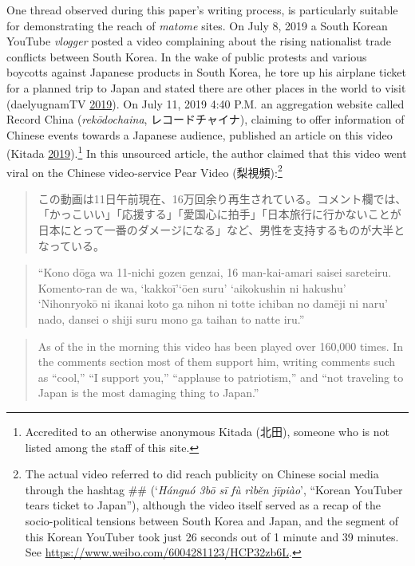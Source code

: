 \documentclass[10pt,british,A4paper,oneside]{memoir}
\begin{document}
One thread observed during this paper's writing process, is particularly
suitable for demonstrating the reach of \emph{matome} sites. On July 8,
2019 a South Korean YouTube \emph{vlogger} posted a video complaining
about the rising nationalist trade conflicts between South Korea. In the
wake of public protests and various boycotts against Japanese products
in South Korea, he tore up his airplane ticket for a planned trip to
Japan and stated there are other places in the world to visit
(daelyugnamTV \protect\hyperlink{ref-daelyugnamtv_eng._2019}{2019}). On
July 11, 2019 4:40 P.M. an aggregation website called Record China
(\emph{rekōdochaina}, レコードチャイナ), claiming to offer information
of Chinese events towards a Japanese audience, published an article on
this video (Kitada
\protect\hyperlink{ref-kitada_eng._2019}{2019}).\footnote{Accredited to
  an otherwise anonymous Kitada (北田), someone who is not listed among
  the staff of this site.} In this unsourced article, the author claimed
that this video went viral on the Chinese video-service Pear Video
(梨視頻):\footnote{The actual video referred to did reach publicity on
  Chinese social media through the hashtag
  \#\# (`\emph{Hánguó \zhu3bō 
  sī fù rìběn jīpiào}', ``Korean YouTuber tears ticket to Japan''),
  although the video itself served as a recap of the socio-political
  tensions between South Korea and Japan, and the segment of this Korean
  YouTuber took just 26 seconds out of 1 minute and 39 minutes. See
  \url{https://www.weibo.com/6004281123/HCP32zb6L}.}

\begin{quote}
この動画は11日午前現在、16万回余り再生されている。コメント欄では、「かっこいい」「応援する」「愛国心に拍手」「日本旅行に行かないことが日本にとって一番のダメージになる」など、男性を支持するものが大半となっている。
\end{quote}

\begin{quote}
``Kono dōga wa 11-nichi gozen genzai, 16 man-kai-amari saisei sareteiru.
Komento-ran de wa, `kakkoī'`ōen suru' `aikokushin ni hakushu'
`Nihonryokō ni ikanai koto ga nihon ni totte ichiban no damēji ni naru'
nado, dansei o shiji suru mono ga taihan to natte iru.''
\end{quote}

\begin{quote}
As of the  in the morning this video has been played over
160,000 times. In the comments section most of them support him, writing
comments such as ``cool,'' ``I support you,'' ``applause to
patriotism,'' and ``not traveling to Japan is the most damaging thing to
Japan.''
\end{quote}
\end{document}
